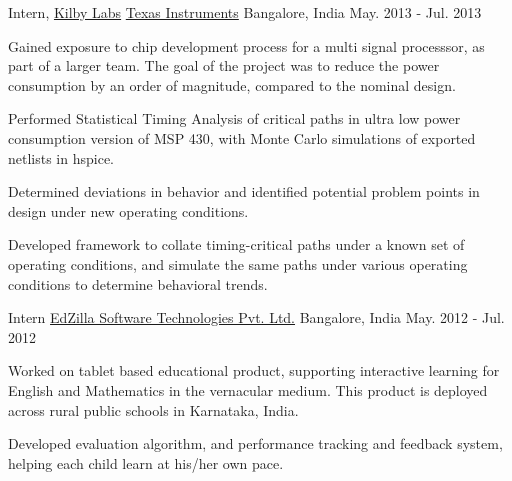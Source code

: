 \begin{cventries}
	\cventry
	{Intern, \href{http://www.ti.com/corp/docs/innovation/research-development/Kilby-Labs.html}{Kilby Labs}}
	{\href{http://www.ti.com/}{Texas Instruments}}
	{Bangalore, India}
	{May. 2013 - Jul. 2013}
	{
		\begin{cvitems}
		\item{Gained exposure to chip development process for a multi signal processsor, as part of a larger team. The goal of the project was to reduce the power consumption by an order of magnitude, compared to the nominal design.}
		\item{Performed Statistical Timing Analysis of critical paths in ultra low power consumption version of MSP 430, with Monte Carlo simulations of exported netlists in hspice.}
		\item{Determined deviations in behavior and identified potential problem points in design under new operating conditions.}
		\item{Developed framework to collate timing-critical paths under a known set of operating conditions, and simulate the same paths under various operating conditions to determine behavioral trends.}
		\end{cvitems}
	}

	\cventry
	{Intern}
	{\href{http://www.edzillasoftech.com/}{EdZilla Software Technologies Pvt. Ltd.}}
	{Bangalore, India}
	{May. 2012 - Jul. 2012}
	{
		\begin{cvitems}
		\item{Worked on tablet based educational product, supporting interactive learning for English and Mathematics in the vernacular medium. This product is deployed across rural public schools in Karnataka, India.}
		\item{Developed evaluation algorithm, and performance tracking and feedback system, helping each child learn at his/her own pace.}
		\end{cvitems}
	}

\end{cventries}
